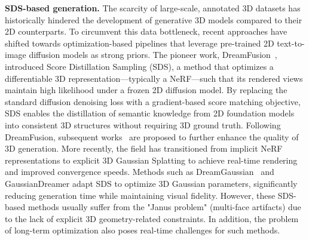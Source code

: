 \documentclass{article} %
\begin{document}
{\bf SDS-based generation.} 
The scarcity of large-scale, annotated 3D datasets has historically hindered the development of generative 3D models compared to their 2D counterparts. To circumvent this data bottleneck, recent approaches have shifted towards optimization-based pipelines that leverage pre-trained 2D text-to-image diffusion models as strong priors. The pioneer work, DreamFusion~\cite{poole2022dreamfusion}, introduced Score Distillation Sampling (SDS), a method that optimizes a differentiable 3D representation—typically a NeRF—such that its rendered views maintain high likelihood under a frozen 2D diffusion model. By replacing the standard diffusion denoising loss with a gradient-based score matching objective, SDS enables the distillation of semantic knowledge from 2D foundation models into consistent 3D structures without requiring 3D ground truth. Following DreamFusion, subsequent works~\cite{wang2023prolificdreamer,EnVision2023luciddreamer,fantasia3d,lin2023magic3d,sweetdreamer} are proposed to further enhance the quality of 3D generation. More recently, the field has transitioned from implicit NeRF representations to explicit 3D Gaussian Splatting \cite{kerbl20233d} to achieve real-time rendering and improved convergence speeds. Methods such as DreamGaussian~\cite{tang2023dreamgaussian} and GaussianDreamer\cite{yi2024gaussiandreamer} adapt SDS to optimize 3D Gaussian parameters, significantly reducing generation time while maintaining visual fidelity. However, these SDS-based methods usually suffer from the "Janus problem" (multi-face artifacts) due to the lack of explicit 3D geometry-related constraints. In addition, the problem of long-term optimization also poses real-time challenges for such methods.
\end{document}
